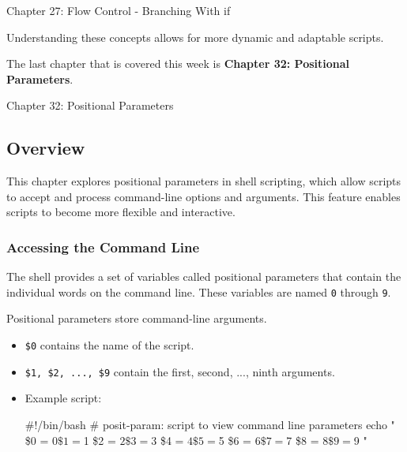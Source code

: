 \begin{notes}{Chapter 27: Flow Control - Branching With if}
\begin{highlight}
    Understanding these concepts allows for more dynamic and adaptable scripts.
    
    \end{highlight}
\end{notes}

The last chapter that is covered this week is \textbf{Chapter 32: Positional Parameters}.

\begin{notes}{Chapter 32: Positional Parameters}
    \subsection*{Overview}

    This chapter explores positional parameters in shell scripting, which allow scripts to accept and process command-line options and arguments. This feature enables scripts to become more flexible and interactive.
    
    \subsubsection*{Accessing the Command Line}
    
    The shell provides a set of variables called positional parameters that contain the individual words on the command line. These variables are named \texttt{0} through \texttt{9}.
    
    \begin{highlight}
    
    Positional parameters store command-line arguments.
    
    \begin{itemize}
        \item \texttt{\$0} contains the name of the script.
        \item \texttt{\$1, \$2, ..., \$9} contain the first, second, ..., ninth arguments.
        \item Example script:
    \begin{code}[Shell]
    #!/bin/bash
    # posit-param: script to view command line parameters
    echo "
    \$0 = $0
    \$1 = $1
    \$2 = $2
    \$3 = $3
    \$4 = $4
    \$5 = $5
    \$6 = $6
    \$7 = $7
    \$8 = $8
    \$9 = $9
    "
    \end{code}
    \end{itemize}
    
    \end{highlight}
    

\end{notes}
